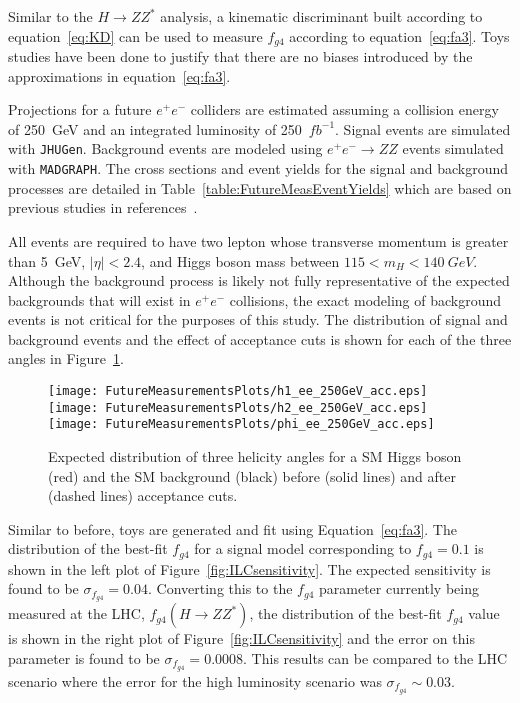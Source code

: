 Similar to the $H\to ZZ^*$ analysis, a kinematic discriminant 
built according to equation~\ref{eq:KD} can be used to measure 
$f_{g4}$ according to equation~\ref{eq:fa3}.  
Toys studies have been done to justify that there are no
biases introduced by the approximations in equation~\ref{eq:fa3}. 

Projections for a future $e^+e^-$
colliders are estimated assuming a collision energy  
of 250~GeV and an integrated luminosity of 250~$fb^{-1}$.
Signal events are simulated with \verb+JHUGen+.  Background events
are modeled using $e^+e^-\to ZZ$ events simulated with
\verb+MADGRAPH+.  
The cross sections and event yields for the signal and
background processes are detailed in 
Table~\ref{table:FutureMeasEventYields}
which are based on previous studies in references~\cite{???}.

All events are required to have two lepton whose 
transverse momentum is greater than 5~GeV, $|\eta|<2.4$, and 
Higgs boson mass between $115<m_H<140~GeV$.  Although
the background process is likely not fully representative
of the expected backgrounds that will exist in $e^+e^-$
collisions, the exact modeling of background events is not
critical for the purposes of this study.
The distribution of signal and background events and the effect
of acceptance cuts is shown for each of the three angles in 
Figure~\ref{fig:ILCanglesWithAccep}. 

\begin{figure}
\begin{center}
\texttt{[image: FutureMeasurementsPlots/h1\_ee\_250GeV\_acc.eps]}
\texttt{[image: FutureMeasurementsPlots/h2\_ee\_250GeV\_acc.eps]}
\texttt{[image: FutureMeasurementsPlots/phi\_ee\_250GeV\_acc.eps]}
\end{center}
\caption{Expected distribution of three helicity angles for
a SM Higgs boson (red) and the SM background (black) before
(solid lines) and after (dashed lines) acceptance cuts.}
\label{fig:ILCanglesWithAccep}
\end{figure}

Similar to before, toys are generated
and fit using Equation~\ref{eq:fa3}.  The distribution of
the best-fit $f_{g4}$ for a signal model corresponding to $f_{g4}=0.1$
is shown in the left plot of Figure~\ref{fig:ILCsensitivity}.  
The expected sensitivity is found to be 
$\sigma_{f_{g4}}=0.04$.  Converting this to the $f_{g4}$ parameter
currently being measured at the LHC, $f_{g4}(H\to ZZ^*)$,
the distribution of the best-fit $f_{g4}$ value is shown in 
the right plot of 
Figure~\ref{fig:ILCsensitivity} and the error on this parameter
is found to be $\sigma_{f_{g4}}=0.0008$.  This results can be
compared to the LHC scenario where the error for the high 
luminosity scenario was $\sigma_{f_{g4}}\sim0.03$.  

